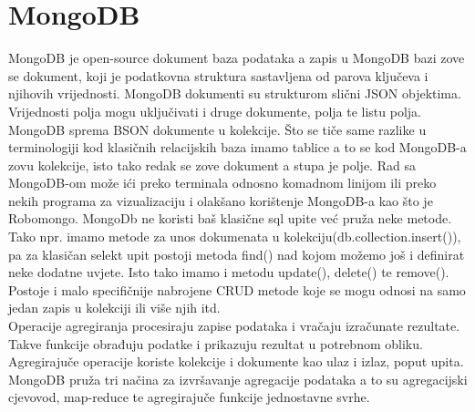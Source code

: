 \documentclass[a4paper,12pt]{foi}
\begin{document}
\chapter{MongoDB}
MongoDB je open-source dokument baza podataka a zapis u MongoDB bazi zove se dokument, koji je podatkovna struktura sastavljena od parova ključeva i njihovih vrijednosti. MongoDB dokumenti su strukturom slični JSON objektima. Vrijednosti polja mogu uključivati i druge dokumente, polja te listu polja.\\
MongoDB sprema BSON dokumente u kolekcije. Što se tiče same razlike u terminologiji kod klasičnih relacijskih baza imamo tablice a to se kod MongoDB-a zovu kolekcije, isto tako redak se zove dokument a stupa je polje.
Rad sa MongoDB-om može ići preko terminala odnosno komadnom linijom ili preko nekih programa za vizualizaciju i olakšano korištenje MongoDB-a kao što je Robomongo. MongoDb ne koristi baš klasične sql upite već pruža neke metode. Tako npr. imamo metode za unos dokumenata u kolekciju(db.collection.insert()), pa za klasičan selekt upit postoji metoda find() nad kojom možemo još i definirat neke dodatne uvjete. Isto tako imamo i metodu update(), delete() te remove(). Postoje i malo specifičnije nabrojene CRUD metode koje se mogu odnosi na samo jedan zapis u kolekciji ili više njih itd.\\
Operacije agregiranja procesiraju zapise podataka i vračaju izračunate rezultate. Takve funkcije obrađuju podatke i prikazuju rezultat u potrebnom obliku. Agregirajuče operacije koriste kolekcije i dokumente kao ulaz i izlaz, poput upita. MongoDB pruža tri načina za izvršavanje agregacije podataka a to su agregacijski cjevovod, map-reduce te agregirajuče funkcije jednostavne svrhe.
\end{document}
